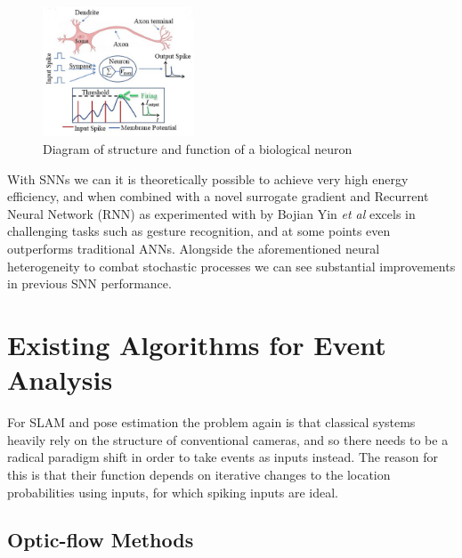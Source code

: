 \begin{figure}[htb]
      \centering
      \includegraphics[width=0.4\textwidth]{background/images/biological_neuron.png}
      \caption{Diagram of structure and function of a biological neuron \cite{BiologicalNeuronModel}}
      \label{fig:biological_neuron}
\end{figure}

With SNNs we can it is theoretically possible to achieve very high energy efficiency, and when combined with a novel surrogate gradient and Recurrent Neural Network (RNN) as experimented with by Bojian Yin \textit{et al}\cite{EfficientSNN} excels in challenging tasks such as gesture recognition, and at some points even outperforms traditional ANNs. Alongside the aforementioned neural heterogeneity to combat stochastic processes we can see substantial improvements in previous SNN performance.

\section{Existing Algorithms for Event Analysis} \label{sec:existing_algorithms}

For SLAM and pose estimation the problem again is that classical systems heavily rely on the structure of conventional cameras, and so there needs to be a radical paradigm shift in order to take events as inputs instead. The reason for this is that their function depends on iterative changes to the location probabilities using inputs, for which spiking inputs are ideal.

\subsection{Optic-flow Methods}

